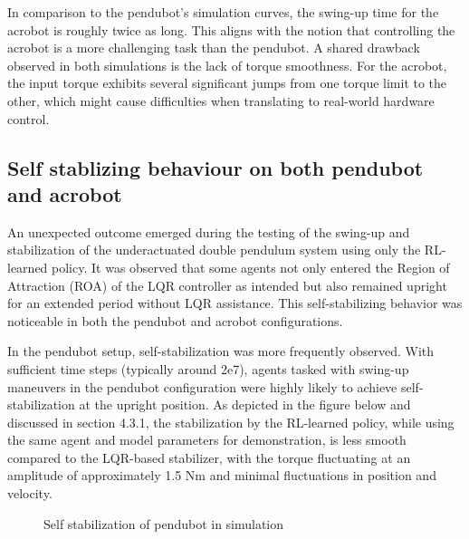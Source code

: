 In comparison to the pendubot's simulation curves, the swing-up time for the acrobot is roughly twice as long. This aligns with the notion that controlling the acrobot is a more challenging task than the pendubot. A shared drawback observed in both simulations is the lack of torque smoothness. For the acrobot, the input torque exhibits several significant jumps from one torque limit to the other, which might cause difficulties when translating to real-world hardware control.

\subsection{Self stablizing behaviour on both pendubot and acrobot}
An unexpected outcome emerged during the testing of the swing-up and stabilization of the underactuated double pendulum system using only the RL-learned policy. It was observed that some agents not only entered the Region of Attraction (ROA) of the LQR controller as intended but also remained upright for an extended period without LQR assistance. This self-stabilizing behavior was noticeable in both the pendubot and acrobot configurations.

In the pendubot setup, self-stabilization was more frequently observed. With sufficient time steps (typically around 2e7), agents tasked with swing-up maneuvers in the pendubot configuration were highly likely to achieve self-stabilization at the upright position. As depicted in the figure below and discussed in section 4.3.1, the stabilization by the RL-learned policy, while using the same agent and model parameters for demonstration, is less smooth compared to the LQR-based stabilizer, with the torque fluctuating at an amplitude of approximately 1.5 Nm and minimal fluctuations in position and velocity.

\begin{figure}[H]
    \centering
    \caption{Self stabilization of pendubot in simulation}
    \label{fig:pendubot_self_stablization}
\end{figure}

